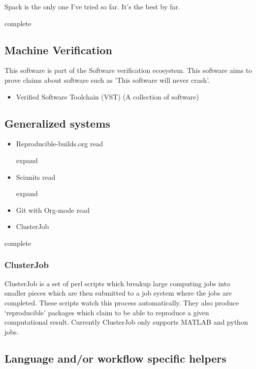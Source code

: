 \documentclass[american]{article}
\newcommand{\Read}{
	\gls{read}
}
\newcommand{\complete}{
	\gls{complete}
}
\newcommand{\expand}{
	\gls{expand}
}
\begin{document}
Spack \cite{Spack} is the only one I've tried so far. It's the best by far.

\complete


\subsection{Machine Verification} \label{sec:software-verification}

This software is part of the Software verification ecosystem. This software aims to prove claims about software such as 'This software will never crash'.

\begin{itemize}
\item Verified Software Toolchain (VST) (A collection of software) \cite{appel-program-logics-2014}
\end{itemize}

\subsection{Generalized systems} \label{sec:software-generalized}

\begin{itemize}
\item Reproducible-builds.org \cite{reproducible-builds} \Read \expand
\item Sciunits \cite{sciunits} \Read \expand
\item Git with Org-mode \cite{Stanisic-git-orgmode-2015} \Read
\item ClusterJob \cite{clusterjob,clusterjob-github}
\end{itemize}

\complete

\subsubsection{ClusterJob}

ClusterJob is a set of perl scripts which breakup large computing jobs into smaller pieces which are then submitted to a job system where the jobs are completed. These scripts watch this process automatically. They also produce `reproducible' packages which claim to be able to reproduce a given computational result. Currently ClusterJob only supports MATLAB and python jobs.

\subsection{Language and/or workflow specific helpers}
\end{document}
